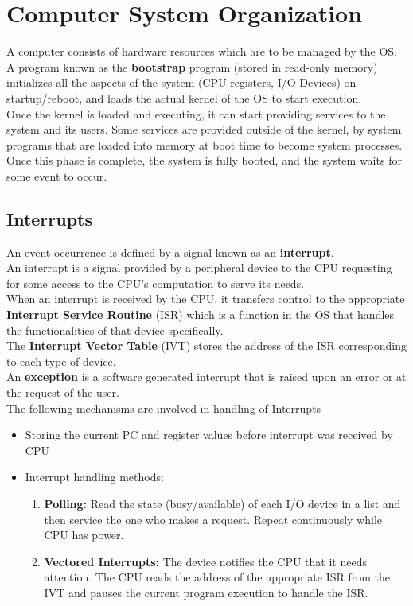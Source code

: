 \documentclass{article}
\theoremstyle{plain}
\theoremstyle{definition}
\begin{document}
\section{Computer System Organization}

A computer consists of hardware resources which are to be managed by the OS.\\
A program known as the \textbf{bootstrap} program (stored in read-only memory) initializes all the aspects of the system (CPU registers, I/O Devices) on startup/reboot, and loads the actual kernel of the OS to start execution.\\
Once the kernel is loaded and executing, it can start providing services to the system and its users. Some services are provided outside of the kernel, by system programs that are loaded into memory at boot time to become system
processes.\\
Once this phase is complete, the system is fully booted, and the system waits for some event to occur.

\subsection{Interrupts}

An event occurrence is defined by a signal known as an \textbf{interrupt}.\\
An interrupt is a signal provided by a peripheral device to the CPU requesting for some access to the CPU's computation to serve its needs.\\
When an interrupt is received by the CPU, it transfers control to the appropriate \textbf{Interrupt Service Routine} (ISR) which is a function in the OS that handles the functionalities of that device specifically.\\
The \textbf{Interrupt Vector Table} (IVT) stores the address of the ISR corresponding to each type of device.\\
An \textbf{exception} is a software generated interrupt that is raised upon an error or at the request of the user.\\
The following mechanisms are involved in handling of Interrupts
\begin{itemize}
    \item Storing the current PC and register values before interrupt was received by CPU
    \item Interrupt handling methods: 
    \begin{enumerate}
        \item \textbf{Polling:} Read the state (busy/available) of each I/O device in a list and then service the one who makes a request. Repeat continuously while CPU has power. 
        
        \item \textbf{Vectored Interrupts:} The device notifies the CPU that it needs attention. The CPU reads the address of the appropriate ISR from the IVT and pauses the current program execution to handle the ISR. 
    \end{enumerate}
\end{itemize}
\end{document}
